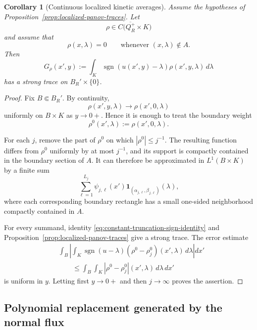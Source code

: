 \documentclass[11pt]{amsart}
\numberwithin{equation}{section}
\theoremstyle{plain}
\newtheorem{corollary}[theorem]{Corollary}
\theoremstyle{definition}
\theoremstyle{remark}
\begin{document}
\begin{corollary}[Continuous localized kinetic averages]
\label{thm:strong-traces-kinetic-averages}
Assume the hypotheses of
Proposition~\ref{prop:localized-panov-traces}.  Let
\[
    \rho\in
    C\bigl(\overline{Q_R^+}\times K\bigr)
\]
and assume that
\[
    \rho(x,\lambda)=0
    \qquad
    \text{whenever }(x,\lambda)\notin A.
\]
Then
\begin{equation}
\label{eq:localized-trace-average}
    G_\rho(x',y)
    :=
    \int_K
        \operatorname{sgn}(u(x',y)-\lambda)
        \rho(x',y,\lambda)\,d\lambda
\end{equation}
has a strong trace on \(B_R'\times\{0\}\).
\end{corollary}

\begin{proof}
Fix \(B\Subset B_R'\).  By continuity,
\[
    \rho(x',y,\lambda)
    \longrightarrow
    \rho(x',0,\lambda)
\]
uniformly on \(B\times K\) as \(y\to0+\).  Hence it is enough to treat the
boundary weight
\[
    \rho^0(x',\lambda):=\rho(x',0,\lambda).
\]

For each \(j\), remove the part of \(\rho^0\) on which
\(|\rho^0|\le j^{-1}\).  The resulting function differs from \(\rho^0\)
uniformly by at most \(j^{-1}\), and its support is compactly contained in
the boundary section of \(A\).  It can therefore be approximated in
\(L^1(B\times K)\) by a finite sum
\[
    \sum_{\ell=1}^{L_j}
        \psi_{j,\ell}(x')
        \mathbf 1_{(\alpha_{j,\ell},\beta_{j,\ell})}(\lambda),
\]
where each corresponding boundary rectangle has a small one-sided
neighborhood compactly contained in \(A\).

For every summand, identity
\eqref{eq:constant-truncation-sign-identity} and
Proposition~\ref{prop:localized-panov-traces} give a strong trace.  The error
estimate
\[
\begin{aligned}
&\int_B
 \left|
 \int_K
     \operatorname{sgn}(u-\lambda)
     (\rho^0-\rho_j^0)(x',\lambda)\,d\lambda
 \right|dx'
\\
&\qquad\le
 \int_B\int_K
     |\rho^0-\rho_j^0|(x',\lambda)\,d\lambda\,dx'
\end{aligned}
\]
is uniform in \(y\).  Letting first \(y\to0+\) and then \(j\to\infty\)
proves the assertion.
\end{proof}

\subsection{Polynomial replacement generated by the normal flux}
\label{subsec:open-nonflat-regions}
\end{document}
